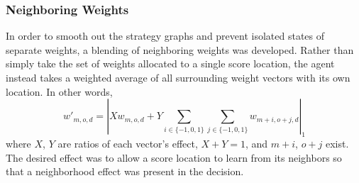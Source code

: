 

\subsubsection{Neighboring Weights}


In order to smooth out the strategy graphs
and prevent isolated states of separate weights,
a blending of neighboring weights was developed.
%
Rather than simply take the set of weights allocated to a single score location,
the agent instead takes a weighted average of all surrounding weight vectors
with its own location.
%
In other words,
\[
    w'_{m,o,d} = %
    \left|
    Xw_{m,o,d} +
    Y \sum_{i\in\{-1,0,1\}} \sum_{j\in\{-1,0,1\}} w_{m+i,o+j,d}
    \right|_1
\]
where $X$, $Y$ are ratios of each vector's effect, $X+Y = 1$,
and $m+i$, $o+j$ exist.
%
The desired effect was to allow a score location to learn from its neighbors
so that a neighborhood effect was present in the decision.

